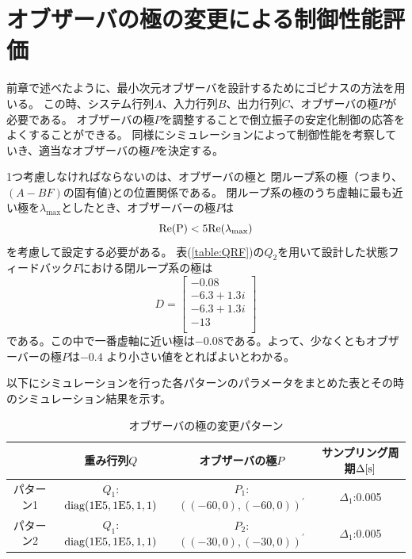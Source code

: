 	
\section{オブザーバの極の変更による制御性能評価}
	前章で述べたように、最小次元オブザーバを設計するためにゴピナスの方法を用いる。
	この時、システム行列$A$、入力行列$B$、出力行列$C$、オブザーバの極$P$が必要である。
	オブザーバの極$P$を調整することで倒立振子の安定化制御の応答をよくすることができる。
	同様にシミュレーションによって制御性能を考察していき、適当なオブザーバの極$P$を決定する。
	\par
	1つ考慮しなければならないのは、オブザーバの極と
	閉ループ系の極（つまり、$(A-BF)$の固有値)との位置関係である。
	閉ループ系の極のうち虚軸に最も近い極を$\lambda_{\max}$としたとき、オブザーバーの極$P$は
	\[
		\rm{Re}(P) <5\rm{Re}(\lambda_{max})
	\]
	を考慮して設定する必要がある。
	表(\ref{table:QRF})の$Q_2$を用いて設計した状態フィードバック$F$における閉ループ系の極は
	\begin{equation}
		D=\left[
		\begin{array}{c}
			-0.08\\
			-6.3+1.3i\\
			-6.3+1.3i\\
			-13\\
		\end{array}
		\right]
		\label{eq:Aeig}
	\end{equation}
	である。この中で一番虚軸に近い極は$-0.08$である。よって、少なくともオブザーバーの極$P$は$-0.4$
	より小さい値をとればよいとわかる。
	\par
	以下にシミュレーションを行った各パターンのパラメータをまとめた表とその時のシミュレーション結果を示す。
	\begin{table}[htb]
		\begin{center}
			\caption{オブザーバの極の変更パターン}
			\medskip
			
			\begin{tabular}{|c|c|c|c|}\hline
				\ \ & 重み行列$Q$ & オブザーバの極$P$ & サンプリング周期$\Delta[\rm{s}]$ \\ \hline\hline
				パターン1 & $Q_1$:$\rm{diag}(1E5,1E5,1,1)$ & $P_1$:$((-60,0),(-60,0))^{'}$ & $\Delta_1$:0.005 \\ \hline
				パターン2 & $Q_1$:$\rm{diag}(1E5,1E5,1,1)$ & $P_2$:$((-30,0),(-30,0))^{'}$ & $\Delta_1$:0.005 \\ \hline
			\end{tabular}
		\end{center}
		\label{table:obsP}
	\end{table}
	
